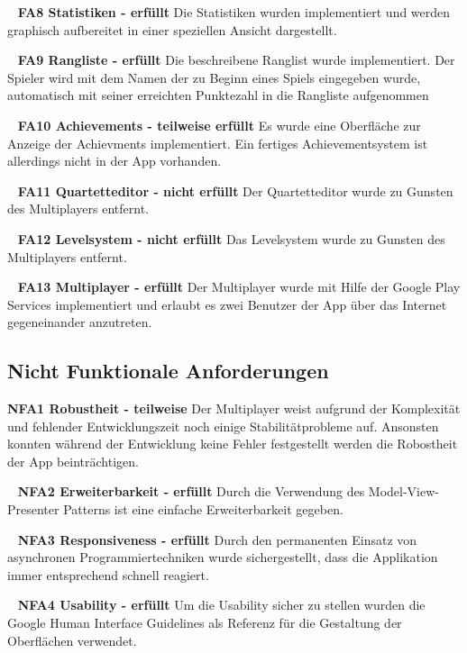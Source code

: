 \documentclass{scrartcl}
\begin{document}
\ \newline
\textbf{FA8 Statistiken - erfüllt} \newline
Die Statistiken wurden implementiert und werden graphisch aufbereitet in einer
speziellen Ansicht dargestellt.

\ \newline
\textbf{FA9 Rangliste - erfüllt} \newline
Die beschreibene Ranglist wurde implementiert. Der Spieler wird mit dem Namen
der zu Beginn eines Spiels eingegeben wurde, automatisch mit seiner erreichten
Punktezahl in die Rangliste aufgenommen

\ \newline
\textbf{FA10 Achievements - teilweise erfüllt} \newline
Es wurde eine Oberfläche zur Anzeige der Achievments implementiert. Ein fertiges
Achievementsystem ist allerdings nicht in der App vorhanden.

\ \newline
\textbf{FA11 Quartetteditor - nicht erfüllt} \newline
Der Quartetteditor wurde zu Gunsten des Multiplayers entfernt.

\ \newline
\textbf{FA12 Levelsystem - nicht erfüllt} \newline
Das Levelsystem wurde zu Gunsten des Multiplayers entfernt.

\ \newline
\textbf{FA13 Multiplayer - erfüllt} \newline
Der Multiplayer wurde mit Hilfe der Google Play Services implementiert und
erlaubt es zwei Benutzer der App über das Internet gegeneinander anzutreten.

\subsection{Nicht Funktionale Anforderungen}

\textbf{NFA1 Robustheit - teilweise} \newline
Der Multiplayer weist aufgrund der Komplexität und fehlender Entwicklungszeit
noch einige Stabilitätprobleme auf. Ansonsten konnten während der Entwicklung
keine Fehler festgestellt werden die Robostheit der App beinträchtigen.

\ \newline
\textbf{NFA2 Erweiterbarkeit - erfüllt} \newline
Durch die Verwendung des Model-View-Presenter Patterns ist eine einfache
Erweiterbarkeit gegeben.

\ \newline
\textbf{NFA3 Responsiveness - erfüllt} \newline
Durch den permanenten Einsatz von asynchronen Programmiertechniken wurde
sichergestellt, dass die Applikation immer entsprechend schnell reagiert.

\ \newline
\textbf{NFA4 Usability - erfüllt} \newline
Um die Usability sicher zu stellen wurden die Google Human Interface Guidelines
als Referenz für die Gestaltung der Oberflächen verwendet.
\end{document}
